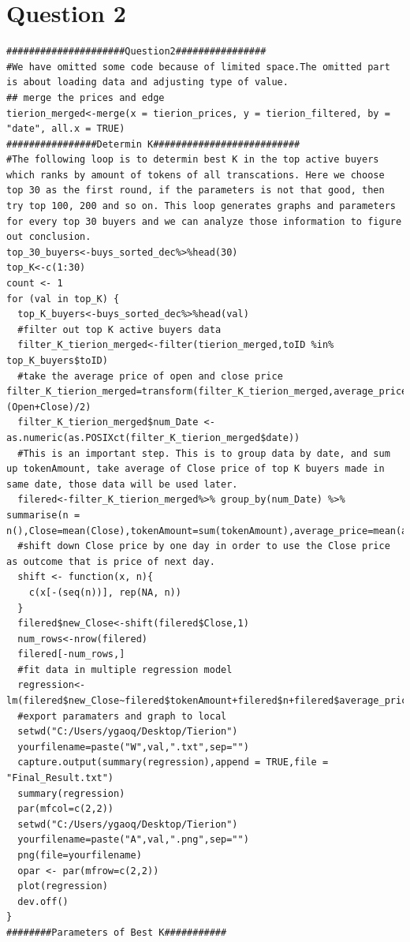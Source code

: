 \documentclass[11pt, letterpaper]{article} %
\begin{document}
\section{Question 2}
\begin{lstlisting}
#####################Question2################
#We have omitted some code because of limited space.The omitted part is about loading data and adjusting type of value.
## merge the prices and edge
tierion_merged<-merge(x = tierion_prices, y = tierion_filtered, by = "date", all.x = TRUE)
################Determin K##########################
#The following loop is to determin best K in the top active buyers which ranks by amount of tokens of all transcations. Here we choose top 30 as the first round, if the parameters is not that good, then try top 100, 200 and so on. This loop generates graphs and parameters for every top 30 buyers and we can analyze those information to figure out conclusion.
top_30_buyers<-buys_sorted_dec%>%head(30)
top_K<-c(1:30)
count <- 1
for (val in top_K) {
  top_K_buyers<-buys_sorted_dec%>%head(val)
  #filter out top K active buyers data
  filter_K_tierion_merged<-filter(tierion_merged,toID %in% top_K_buyers$toID)
  #take the average price of open and close price filter_K_tierion_merged=transform(filter_K_tierion_merged,average_price= (Open+Close)/2)
  filter_K_tierion_merged$num_Date <-  as.numeric(as.POSIXct(filter_K_tierion_merged$date))
  #This is an important step. This is to group data by date, and sum up tokenAmount, take average of Close price of top K buyers made in same date, those data will be used later.
  filered<-filter_K_tierion_merged%>% group_by(num_Date) %>% summarise(n = n(),Close=mean(Close),tokenAmount=sum(tokenAmount),average_price=mean(average_price))
  #shift down Close price by one day in order to use the Close price as outcome that is price of next day.
  shift <- function(x, n){
    c(x[-(seq(n))], rep(NA, n))
  }
  filered$new_Close<-shift(filered$Close,1)
  num_rows<-nrow(filered)
  filered[-num_rows,]
  #fit data in multiple regression model
  regression<-lm(filered$new_Close~filered$tokenAmount+filered$n+filered$average_price)
  #export paramaters and graph to local
  setwd("C:/Users/ygaoq/Desktop/Tierion")
  yourfilename=paste("W",val,".txt",sep="")
  capture.output(summary(regression),append = TRUE,file = "Final_Result.txt")
  summary(regression)
  par(mfcol=c(2,2))
  setwd("C:/Users/ygaoq/Desktop/Tierion")
  yourfilename=paste("A",val,".png",sep="")
  png(file=yourfilename)
  opar <- par(mfrow=c(2,2))
  plot(regression)
  dev.off()
}
########Parameters of Best K###########

\end{lstlisting}
\end{document}
